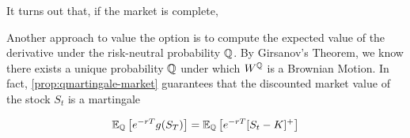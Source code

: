 \documentclass[../TGMAFFIRO.tex]{subfiles}
\begin{document}
 It turns out that, if the market is complete, 
 
 Another approach to value the option is to compute the expected value of the derivative under the risk-neutral probability $\mathbb{Q}$. By Girsanov's Theorem, we know there exists a unique probability $\mathbb{Q}$ under which $W^{\mathbb{Q}}$ is a Brownian Motion. In fact, \ref{prop:qmartingale-market} guarantees that the discounted market value of the stock $S_t$ is a martingale
  
 \begin{equation}
 	\mathbb{E}_{\mathbb{Q}}\left[e^{-rT}g(S_T)\right] = \mathbb{E}_{\mathbb{Q}}\left[e^{-rT}[S_t - K]^+\right]
 \end{equation}

 
\end{document}
